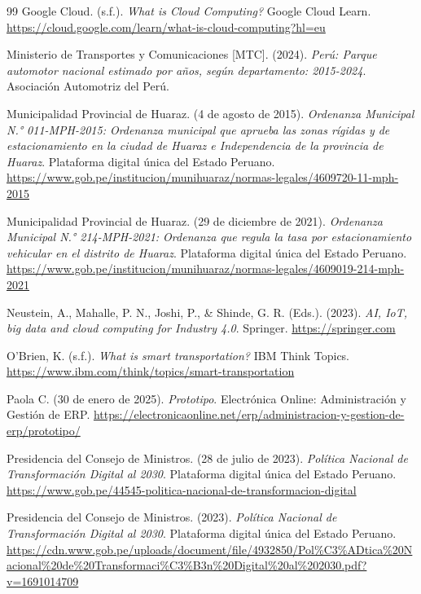 \documentclass[12pt,a4paper]{article}
\begin{document}
\begin{thebibliography}{99}
	Google Cloud. (s.f.).
	\textit{What is Cloud Computing?}
	Google Cloud Learn.
	\url{https://cloud.google.com/learn/what-is-cloud-computing?hl=eu}
	
	Ministerio de Transportes y Comunicaciones [MTC]. (2024).
	\textit{Perú: Parque automotor nacional estimado por años, según departamento: 2015-2024}.
	Asociación Automotriz del Perú.
	
	Municipalidad Provincial de Huaraz. (4 de agosto de 2015).
	\textit{Ordenanza Municipal N.° 011-MPH-2015: Ordenanza municipal que aprueba las zonas rígidas y de estacionamiento en la ciudad de Huaraz e Independencia de la provincia de Huaraz}.
	Plataforma digital única del Estado Peruano.
	\url{https://www.gob.pe/institucion/munihuaraz/normas-legales/4609720-11-mph-2015}
	
	Municipalidad Provincial de Huaraz. (29 de diciembre de 2021).
	\textit{Ordenanza Municipal N.° 214-MPH-2021: Ordenanza que regula la tasa por estacionamiento vehicular en el distrito de Huaraz}.
	Plataforma digital única del Estado Peruano.
	\url{https://www.gob.pe/institucion/munihuaraz/normas-legales/4609019-214-mph-2021}
	
	Neustein, A., Mahalle, P. N., Joshi, P., \& Shinde, G. R. (Eds.). (2023).
	\textit{AI, IoT, big data and cloud computing for Industry 4.0}.
	Springer.
	\url{https://springer.com}
	
	O'Brien, K. (s.f.).
	\textit{What is smart transportation?}
	IBM Think Topics.
	\url{https://www.ibm.com/think/topics/smart-transportation}
	
	Paola C. (30 de enero de 2025).
	\textit{Prototipo}.
	Electrónica Online: Administración y Gestión de ERP.
	\url{https://electronicaonline.net/erp/administracion-y-gestion-de-erp/prototipo/}
	
	Presidencia del Consejo de Ministros. (28 de julio de 2023).
	\textit{Política Nacional de Transformación Digital al 2030}.
	Plataforma digital única del Estado Peruano.
	\url{https://www.gob.pe/44545-politica-nacional-de-transformacion-digital}
	
	Presidencia del Consejo de Ministros. (2023).
	\textit{Política Nacional de Transformación Digital al 2030}.
	Plataforma digital única del Estado Peruano.
	\url{https://cdn.www.gob.pe/uploads/document/file/4932850/Pol%C3%ADtica%20Nacional%20de%20Transformaci%C3%B3n%20Digital%20al%202030.pdf?v=1691014709}
	

\end{thebibliography}
\end{document}
